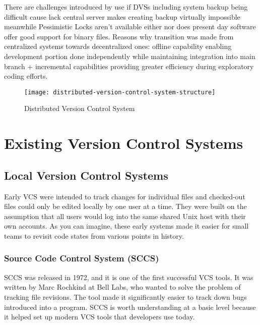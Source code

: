 There are challenges introduced by use if DVSs including system backup being difficult cause lack central server makes creating backup virtually impossible meanwhile Pessimistic Locks aren't available either nor does present day software offer good support for binary files. Reasons why transition was made from centralized systems towards decentralized ones: offline capability enabling development portion done independently while maintaining integration into main branch + incremental capabilities providing greater efficiency during exploratory coding efforts.

\begin{figure}[h]
    \centering
    \texttt{[image: distributed-version-control-system-structure]}
    \caption{Distributed Version Control System}
    \label{fig:dvcs-structure}
\end{figure}
\section{Existing Version Control Systems}
\subsection{Local Version Control Systems}
Early VCS were intended to track changes for individual files and checked-out files could only be edited locally by one user at a time. They were built on the assumption that all users would log into the same shared Unix host with their own accounts. As you can imagine, these early systems made it easier for small teams to revisit code states from various points in history.
\subsubsection{Source Code Control System (SCCS)}
SCCS was released in 1972, and it is one of the first successful VCS tools. It was written by Marc Rochkind at Bell Labs, who wanted to solve the problem of tracking file revisions. The tool made it significantly easier to track down bugs introduced into a program. SCCS is worth understanding at a basic level because it helped set up modern VCS tools that developers use today.
